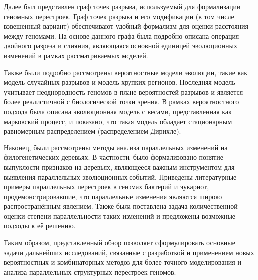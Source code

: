 Далее был представлен граф точек разрыва, используемый для формализации геномных перестроек.
Граф точек разрыва и его модификации (в том числе взвешенный вариант) обеспечивают удобный формализм для оценки расстояния между геномами.
На основе данного графа была подробно описана операция двойного разреза и слияния, являющаяся основной единицей эволюционных изменений в рамках рассматриваемых моделей.

Также были подробно рассмотрены вероятностные модели эволюции, такие как модель случайных разрывов и модель хрупких регионов.
Последняя модель учитывает неоднородность геномов в плане вероятностей разрывов и является более реалистичной с биологической точки зрения.
В рамках вероятностного подхода была описана эволюционная модель с весами, представленная как марковский процесс, и показано, что такая модель обладает стационарным равномерным распределением (распределением Дирихле).

Наконец, были рассмотрены методы анализа параллельных изменений на филогенетических деревьях.
В частности, было формализовано понятие выпуклости признаков на деревьях, являющееся важным инструментом для выявления параллельных эволюционных событий.
Приведены литературные примеры параллельных перестроек в геномах бактерий и эукариот, продемонстрировавшие, что параллельные изменения являются широко распространённым явлением.
Также была поставлена задача количественной оценки степени параллельности таких изменений и предложены возможные подходы к её решению.

Таким образом, представленный обзор позволяет сформулировать основные задачи дальнейших исследований, связанные с разработкой и применением новых вероятностных и комбинаторных методов для более точного моделирования и анализа параллельных структурных перестроек геномов.
